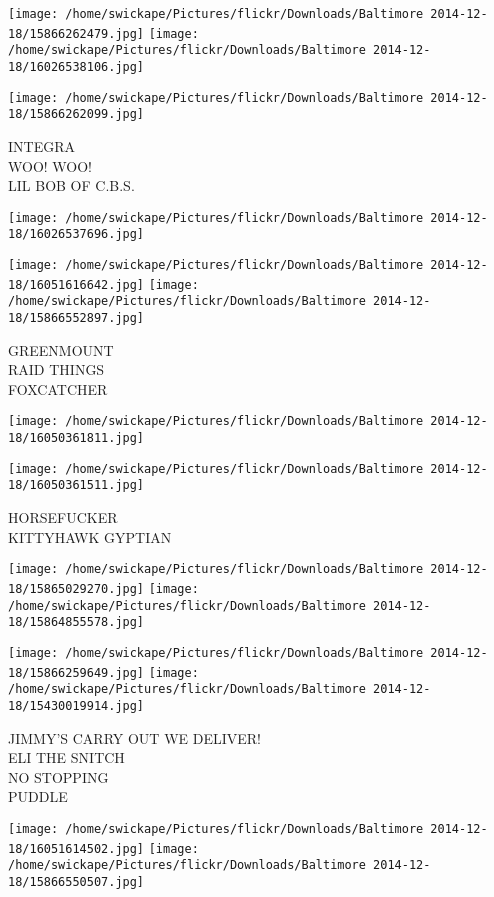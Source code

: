 \documentclass[10pt,letterpaper]{article}
\begin{document}
\texttt{[image: /home/swickape/Pictures/flickr/Downloads/Baltimore 2014-12-18/15866262479.jpg]}
\texttt{[image: /home/swickape/Pictures/flickr/Downloads/Baltimore 2014-12-18/16026538106.jpg]}

\vspace{0.25in}
\texttt{[image: /home/swickape/Pictures/flickr/Downloads/Baltimore 2014-12-18/15866262099.jpg]}

INTEGRA\\
WOO!  WOO!\\
LIL BOB OF C.B.S.
\pagebreak

\texttt{[image: /home/swickape/Pictures/flickr/Downloads/Baltimore 2014-12-18/16026537696.jpg]}

\vspace{0.25in}
\texttt{[image: /home/swickape/Pictures/flickr/Downloads/Baltimore 2014-12-18/16051616642.jpg]}
\texttt{[image: /home/swickape/Pictures/flickr/Downloads/Baltimore 2014-12-18/15866552897.jpg]}

GREENMOUNT\\
RAID THINGS\\
FOXCATCHER
\pagebreak

\texttt{[image: /home/swickape/Pictures/flickr/Downloads/Baltimore 2014-12-18/16050361811.jpg]}

\vspace{0.25in}
\texttt{[image: /home/swickape/Pictures/flickr/Downloads/Baltimore 2014-12-18/16050361511.jpg]}

HORSEFUCKER\\
KITTYHAWK GYPTIAN
\pagebreak

\texttt{[image: /home/swickape/Pictures/flickr/Downloads/Baltimore 2014-12-18/15865029270.jpg]}
\texttt{[image: /home/swickape/Pictures/flickr/Downloads/Baltimore 2014-12-18/15864855578.jpg]}

\texttt{[image: /home/swickape/Pictures/flickr/Downloads/Baltimore 2014-12-18/15866259649.jpg]}
\texttt{[image: /home/swickape/Pictures/flickr/Downloads/Baltimore 2014-12-18/15430019914.jpg]}

JIMMY'S CARRY OUT WE DELIVER!\\
ELI THE SNITCH\\
NO STOPPING\\
PUDDLE
\pagebreak

\texttt{[image: /home/swickape/Pictures/flickr/Downloads/Baltimore 2014-12-18/16051614502.jpg]}
\texttt{[image: /home/swickape/Pictures/flickr/Downloads/Baltimore 2014-12-18/15866550507.jpg]}
\end{document}
